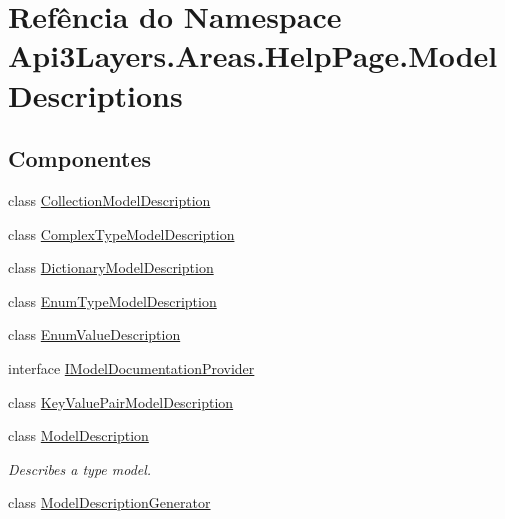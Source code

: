 \hypertarget{namespaceApi3Layers_1_1Areas_1_1HelpPage_1_1ModelDescriptions}{}\section{Refência do Namespace Api3\+Layers.\+Areas.\+Help\+Page.\+Model\+Descriptions}
\label{namespaceApi3Layers_1_1Areas_1_1HelpPage_1_1ModelDescriptions}
\subsection*{Componentes}
\begin{DoxyCompactItemize}
\item 
class \hyperlink{classApi3Layers_1_1Areas_1_1HelpPage_1_1ModelDescriptions_1_1CollectionModelDescription}{Collection\+Model\+Description}
\item 
class \hyperlink{classApi3Layers_1_1Areas_1_1HelpPage_1_1ModelDescriptions_1_1ComplexTypeModelDescription}{Complex\+Type\+Model\+Description}
\item 
class \hyperlink{classApi3Layers_1_1Areas_1_1HelpPage_1_1ModelDescriptions_1_1DictionaryModelDescription}{Dictionary\+Model\+Description}
\item 
class \hyperlink{classApi3Layers_1_1Areas_1_1HelpPage_1_1ModelDescriptions_1_1EnumTypeModelDescription}{Enum\+Type\+Model\+Description}
\item 
class \hyperlink{classApi3Layers_1_1Areas_1_1HelpPage_1_1ModelDescriptions_1_1EnumValueDescription}{Enum\+Value\+Description}
\item 
interface \hyperlink{interfaceApi3Layers_1_1Areas_1_1HelpPage_1_1ModelDescriptions_1_1IModelDocumentationProvider}{I\+Model\+Documentation\+Provider}
\item 
class \hyperlink{classApi3Layers_1_1Areas_1_1HelpPage_1_1ModelDescriptions_1_1KeyValuePairModelDescription}{Key\+Value\+Pair\+Model\+Description}
\item 
class \hyperlink{classApi3Layers_1_1Areas_1_1HelpPage_1_1ModelDescriptions_1_1ModelDescription}{Model\+Description}
\begin{DoxyCompactList}\small\item\em Describes a type model. \end{DoxyCompactList}\item 
class \hyperlink{classApi3Layers_1_1Areas_1_1HelpPage_1_1ModelDescriptions_1_1ModelDescriptionGenerator}{Model\+Description\+Generator}

\end{DoxyCompactItemize}
